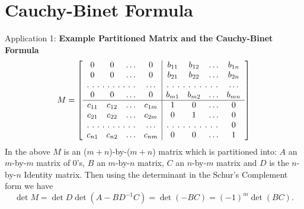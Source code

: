 \section{Cauchy-Binet Formula}

 Application 1: {\bf Example Partitioned Matrix and the Cauchy-Binet Formula}
 \begin{equation}
 M =
\left[
  \begin{array}{cccc|cccc}
  0 &  0 & \hdots & 0  & b_{11} & b_{12} & \hdots & b_{1n}\\
  0 & 0 & \hdots  & 0 & b_{21} & b_{22} & \hdots & b_{2n}\\
  \hdotsfor[2]{3} & \hdots &\hdotsfor[2]{3} & \hdots\\
  0 & 0 & \hdots  & 0 & b_{m1} & b_{m2} & \hdots & b_{mn}\\
  \hline
  c_{11} &  c_{12} &\hdots & c_{1m} & 1 & 0& \hdots & 0\\
  c_{21} &  c_{22} &\hdots & c_{2m} & 0 & 1& \hdots & 0\\
  \hdotsfor[2]{3} & \hdots & \hdotsfor[2]{3} & 0\\
  c_{n1} &  c_{n2} &\hdots & c_{nm} & 0 & 0& \hdots& 1 
\end{array} \right]
\end{equation}
In the above $M$ is an ($m+n$)-by-($m+n$) matrix which is partitioned into: $A$ an $m$-by-$m$ matrix of 0's, $B$ an $m$-by-$n$ matrix, $C$ an $n$-by-$m$ matrix and $D$ is the $n$-by-$n$ Identity matrix. Then using the determinant in the Schur's Complement form we have
$$\det M = \det D \det(A - BD^{-1}C) = \det (-BC) = (-1)^m \det(BC).$$\\

